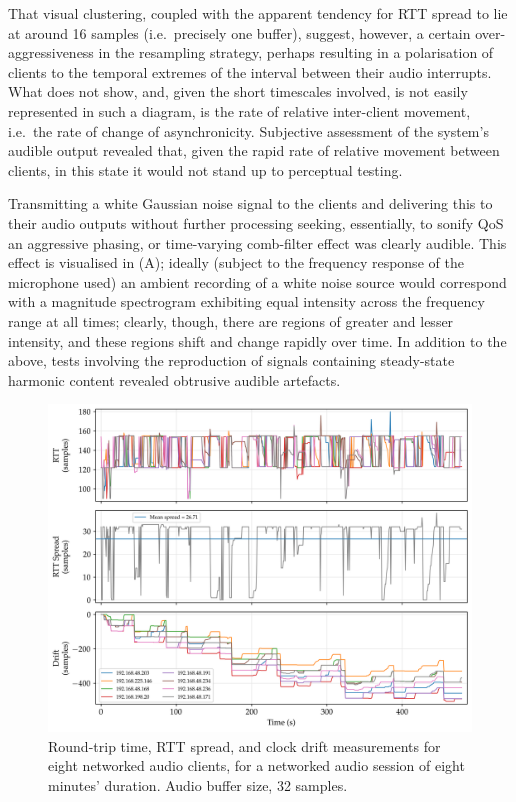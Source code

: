 That visual clustering, coupled with the apparent tendency for RTT spread to
lie at around 16 samples (i.e.\ precisely one buffer), suggest, however, a
certain over-aggressiveness in the resampling strategy, perhaps resulting in a
polarisation of clients to the temporal extremes of the interval between their
audio interrupts.
What  does not show, and, given the short timescales
involved, is not easily represented in such a diagram, is the rate of relative
inter-client movement, i.e.\ the rate of change of asynchronicity.
Subjective assessment of the system's audible output revealed that, given the
rapid rate of relative movement between clients, in this state it would not
stand up to perceptual testing.

Transmitting a white Gaussian noise signal to the clients and delivering this to
their audio outputs without further processing \textemdash{} seeking,
essentially, to sonify QoS \textemdash{} an aggressive phasing, or time-varying
comb-filter effect was clearly audible.
This effect is visualised in (A);
ideally (subject to the frequency response of the microphone used) an ambient
recording of a white noise source would correspond with a magnitude spectrogram
exhibiting equal intensity across the frequency range at all times;
clearly, though, there are regions of greater and lesser intensity, and these
regions shift and change rapidly over time.
In addition to the above, tests involving the reproduction of signals
containing steady-state harmonic content revealed obtrusive audible artefacts.

\begin{figure}[h]
    \centering
    \includegraphics[width=\textwidth]{figures/rtt_drift_32}
    \caption{
        Round-trip time, RTT spread, and clock drift measurements
        for eight networked audio clients, for a networked audio session of
        eight minutes' duration.
        Audio buffer size, 32 samples.
    }
    \label{fig:rtt-drift-32}
\end{figure}


